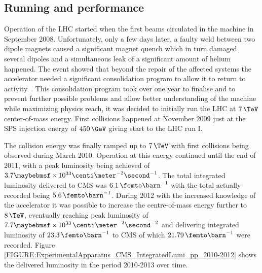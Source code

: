 \subsection{Running and performance}
\label{SUBSECTION:ExperimentalApparatus_CMS_RunningAndPerformance}


Operation of the \gls{LHC} started when the first beams circulated in the machine in September 2008. Unfortunately, only a few days later, a faulty weld between two dipole magnets caused a significant magnet quench which in turn damaged several dipoles and a simultaneous leak of a significant amount of helium happened. The event showed that beyond the repair of the affected systems the accelerator needed a significant consolidation program to allow it to return to activity~\cite{ARTICLE:CMSReportIncident19Sep2008}. This consolidation program took over one year to finalise and to prevent further possible problems and allow better understanding of the machine while maximizing physics reach, it was decided to initially run the \gls{LHC} at $7\,\TeV$ center-of-mass energy.
First collisions happened at November 2009 just at the \gls{SPS} injection energy of $450\,\GeV$ giving start to the \gls{LHC} run I.

The collision energy was finally ramped up to $7\,\TeV$ with first collisions being observed during March 2010. Operation at this energy continued until the end of 2011, with a peak luminosity being achieved of $3.7 \times 10^{33} \centi\meter^{-2}\second^{-1}$. The total integrated luminosity delivered to \gls{CMS} was $6.1\,\femto\barn^{-1}$ with the total actually recorded being $5.6\,\femto\barn^{-1}$. During 2012 with the increased knowledge of the accelerator it was possible to increase the centre-of-mass energy further to $8\,\TeV$, eventually reaching peak luminosity of $7.7 \times 10^{33}\,\centi\meter^{-2}\second^{-2}$ and delivering integrated luminosity of $23.3\,\femto\barn^{-1}$ to \gls{CMS} of which $21.79\,\femto\barn^{-1}$ were recorded. Figure \ref{FIGURE:ExperimentalApparatus_CMS_IntegratedLumi_pp_2010-2012} shows the delivered luminosity in the period 2010-2013 over time.

